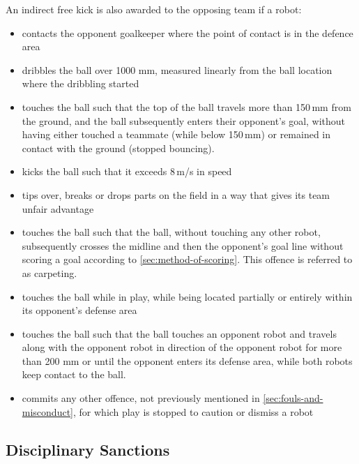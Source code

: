 An indirect free kick is also awarded to the opposing team if a robot:
\begin{itemize}
\item contacts the opponent goalkeeper where the point of contact is in the defence area
\item dribbles the ball over 1000 mm, measured linearly from the ball location where the
dribbling started
\item touches the ball such that the top of the ball travels more than 150\,mm from the ground, and the ball subsequently enters their opponent's goal, without having either touched a teammate (while below 150\,mm) or remained in contact with the ground (stopped bouncing).
\item kicks the ball such that it exceeds 8\,m/s in speed
\item tips over, breaks or drops parts on the field in a way that gives its team unfair advantage
\item touches the ball such that the ball, without touching any other
  robot, subsequently crosses the  midline and then the opponent's goal line
  without scoring a goal according to \autoref{sec:method-of-scoring}. This offence is referred to as carpeting.
\item touches the ball while in play, while being located partially or
entirely within its opponent's defense area
\item touches the ball such that the ball touches an opponent robot and travels along with the opponent robot in direction of the
opponent robot for more than 200 mm or until the opponent enters its defense area, while both robots keep contact to the ball.
\item commits any other offence, not previously mentioned in \autoref{sec:fouls-and-misconduct}, for which play is stopped to caution or dismiss a robot
\end{itemize}

\subsection{Disciplinary Sanctions}\label{subsec:fouls-and-misconduct-disciplinary-sanctions}
